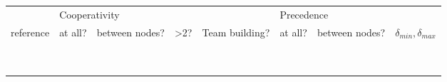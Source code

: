 \begin{table}[t]
	\tableConfig
	\begin{tabular*}{\textwidth}{@{\extracolsep{\fill}}lccccccc}
		\toprule
		\multicolumn{1}{l}{} 								&
		\multicolumn{4}{l}{Cooperativity} 					&
		\multicolumn{3}{l}{Precedence} 						\\
		\cmidrule(rl){2-5} \cmidrule(rl){6-8}
		\multicolumn{1}{l}{reference} 						&
		\multicolumn{1}{l}{at all?} 						&
		\multicolumn{1}{l}{between nodes?} 					&
		\multicolumn{1}{l}{>2?} 							&
		\multicolumn{1}{l}{Team building?} 					&
		\multicolumn{1}{l}{at all?} 						&
		\multicolumn{1}{l}{between nodes?} 					&
		\multicolumn{1}{l}{$\delta_{min}, \delta_{max}$} 	\\
		\midrule %
		\cite{bredstromCombinedVehicleRouting2008a} & 
			\yes & 
			\yes & 
			\yes &  
			 & 
			\yes & 
			\yes & 
			\yes \\
		\cite{rasmussenHomeCareCrew2012} & 
			\yes & 
			\yes & 
			\yes & 
			 & 
			\yes & 
			\yes & 
			\yes \\
		\cite{mankowskaHomeHealthCare2014} & 
			\yes & 
			 & 
	  		 & 
			 & 
			\yes & 
			 & 
			\yes \\
		\cite{haddadeneNSGAIIEnhancedLocal2016} & 
			\yes & 
			 & 
			\yes & 
			 & 
			\yes & 
			 & 
			\yes \\
		\cite{aithaddadeneGRASPILSVehicle2016} & 
			\yes &
			 & 
			\yes &
			 & 
			\yes & 
			 & 
			\yes \\
		\cite{lasfargeasSolvingHomeHealth2019} & 
			\yes & 
			\yes & 
			\yes &  
			 & 
			\yes & 
			\yes & 
			\yes \\
		\cite{manavizadehUsingMetaheuristicAlgorithm2020} & 
			\yes & 
			\yes & 
			\yes &  
			 & 
			\yes & 
			\yes & 
			\yes \\
		\cite{entezariDevelopingMathematicalModel2020} & 
			\yes & 
			\yes & 
			\yes &  
			 & 
			\yes & 
			\yes & 
			\yes \\
		\cite{korsahOptimalVehicleRouting2010} & 
			 & 
			 & 
			 & 
			 & 
			\yes & 
			\yes & 
			 \\

\end{tabular*}
\end{table}
